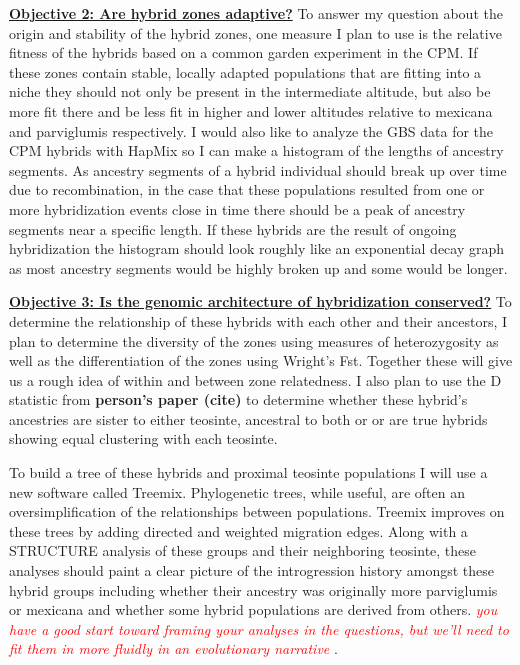 \documentclass[12pt]{amsart}
\newcommand{\mbh}[1]{\textcolor{red}{ \emph{\scriptsize  #1}} }
\begin{document}
\hfill\break \textbf{\underline{Objective 2: Are hybrid zones adaptive?} }To answer my question about the origin and stability of the hybrid zones, one measure I plan to use is the relative fitness of the hybrids based on a common garden experiment in the CPM. 
If these zones contain stable, locally adapted populations that are fitting into a niche they should not only be present in the intermediate altitude, but also be more fit there and be less fit in higher and lower altitudes relative to mexicana and parviglumis respectively.
I would also like to analyze the GBS data for the CPM hybrids with HapMix so I can make a histogram of the lengths of ancestry segments.
As ancestry segments of a hybrid individual should break up over time due to recombination, in the case that these populations resulted from one or more hybridization events close in time there should be a peak of ancestry segments near a specific length.
If these hybrids are the result of ongoing hybridization the histogram should look roughly like an exponential decay graph as most ancestry segments would be highly broken up and some would be longer.%

\hfill\break \textbf{\underline{Objective 3: Is the genomic architecture of hybridization conserved?} } To determine the relationship of these hybrids with each other and their ancestors, I plan to determine the diversity of the zones using measures of heterozygosity as well as the differentiation of the zones using Wright's Fst.  
Together these will give us a rough idea of within and between zone relatedness.
I also plan to use the D statistic from \textbf{person's paper (cite)} to determine whether these hybrid's ancestries are sister to either teosinte, ancestral to both or or are true hybrids showing equal clustering with each teosinte.

To build a tree of these hybrids and proximal teosinte populations I will use a new software called Treemix.
Phylogenetic trees, while useful, are often an oversimplification of the relationships between populations. %
Treemix improves on these trees by adding directed and weighted migration edges. %
Along with a STRUCTURE analysis of these groups and their neighboring teosinte, these analyses should paint a clear picture of the introgression history amongst these hybrid groups including whether their ancestry was originally more parviglumis or mexicana and whether some hybrid populations are derived from others.
\mbh{you have a good start toward framing your analyses in the questions, but we'll need to fit them in more fluidly in an evolutionary narrative}.
\end{document}
